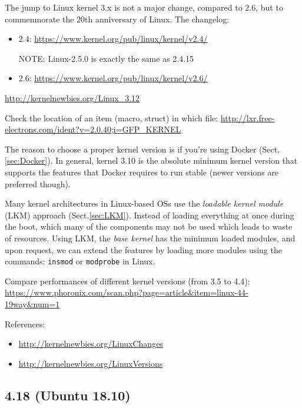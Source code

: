 The jump to Linux kernel 3.x is not a major change, compared to
2.6, but to commenmorate the 20th anniversary of Linux.
The changelog:
\begin{itemize}
  \item 2.4: \url{https://www.kernel.org/pub/linux/kernel/v2.4/}
  
  NOTE: Linux-2.5.0 is exactly the same as 2.4.15
  
  \item 2.6: \url{https://www.kernel.org/pub/linux/kernel/v2.6/}
\end{itemize}
\url{http://kernelnewbies.org/Linux_3.12}

Check the location of an item (macro, struct) in which file: 
\url{http://lxr.free-electrons.com/ident?v=2.0.40;i=GFP_KERNEL}

The reason to choose a proper kernel version is if you're using Docker
(Sect.\ref{sec:Docker}).
In general, kernel 3.10 is the absolute minimum kernel version that supports the
features that Docker requires to run stable (newer versions are preferred
though).


Many kernel architectures in Linux-based OSs use the {\it loadable kernel
module} (LKM) approach (Sect.\ref{sec:LKM}). Instead of loading everything at
once during the boot, which many of the components may not be used which leads
to waste of resources. Using LKM, the {\it base kernel} has the minimum loaded
modules, and upon request, we can extend the features by loading more modules
using the commands: \verb!insmod! or \verb!modprobe! in Linux.

Compare performances of different kernel versions (from 3.5 to 4.4):
\url{https://www.phoronix.com/scan.php?page=article&item=linux-44-19way&num=1}

References:
\begin{itemize}
  \item 
\url{http://kernelnewbies.org/LinuxChanges}

  \item
\url{http://kernelnewbies.org/LinuxVersions}
\end{itemize}


\subsection{4.18 (Ubuntu 18.10)}
\label{sec:linux-kernel-4.18}

